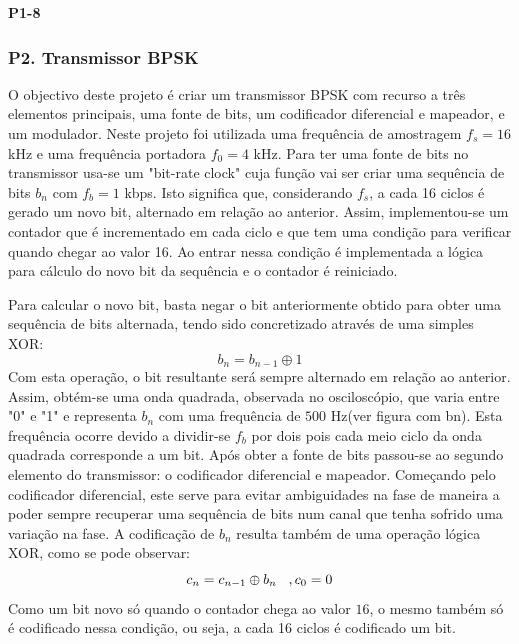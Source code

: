 \documentclass[11pt]{article}
\begin{document}
\textbf{P1-8}
\label{para:P1-8}

\subsubsection{P2. Transmissor BPSK}

O objectivo deste projeto é criar um transmissor BPSK com recurso a três elementos principais, uma fonte de bits, um codificador diferencial e mapeador, e um modulador.
Neste projeto foi utilizada uma frequência de amostragem $f_s=16$ kHz e uma frequência portadora $f_0=4$ kHz.
\vfill
Para ter uma fonte de bits no transmissor usa-se um "bit-rate clock" cuja função vai ser criar uma sequência de bits $ b_n $ com $f_b=1$ kbps. Isto significa que, considerando $f_s$, a cada 16 ciclos é gerado um novo bit, alternado em relação ao anterior. Assim, implementou-se um contador que é incrementado em cada ciclo  e que tem uma condição para verificar quando chegar ao valor 16. Ao entrar nessa condição é implementada a lógica para cálculo do novo bit da sequência e o contador é reiniciado.

Para calcular o novo bit, basta negar o bit anteriormente obtido para obter uma sequência de bits alternada, tendo sido concretizado através de uma simples XOR:
\begin{equation}
b_n=b_{n-1} \oplus 1
\end{equation}
Com esta operação, o bit resultante será sempre alternado em relação ao anterior.
Assim, obtém-se uma onda quadrada, observada no osciloscópio, que varia entre "0" e "1" e representa $ b_n $  com uma frequência de $500$ Hz(ver figura com bn). Esta frequência ocorre devido a dividir-se  $f_b$ por dois pois cada meio ciclo da onda quadrada corresponde a um bit.  
\vfill
Após obter a fonte de bits passou-se ao segundo elemento do transmissor: o codificador diferencial e mapeador. Começando pelo codificador diferencial, este serve para evitar ambiguidades na fase de maneira a poder sempre recuperar uma sequência de bits num canal que tenha sofrido uma variação na fase.
A codificação de $b_n$ resulta também de uma operação lógica XOR, como se pode observar: 
\begin{equation}
c_n=c_{n-1} \oplus b_n \hspace{3 mm} ,c_0=0
\end{equation}
Como um bit novo só quando o contador chega ao valor $16$, o mesmo também só é codificado nessa condição, ou seja, a cada 16 ciclos é codificado um bit. 
\end{document}
